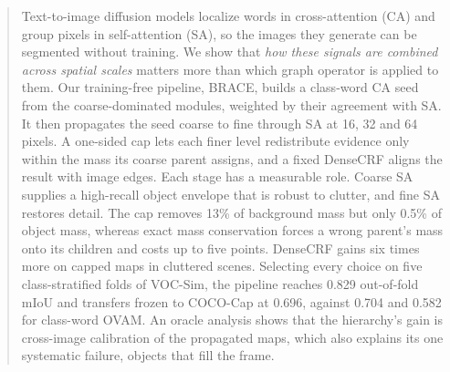 \begin{abstract}
Text-to-image diffusion models localize words in cross-attention (CA) and group pixels in self-attention (SA), so the images they generate can be segmented without training. We show that \emph{how these signals are combined across spatial scales} matters more than which graph operator is applied to them. Our training-free pipeline, BRACE, builds a class-word CA seed from the coarse-dominated modules, weighted by their agreement with SA. It then propagates the seed coarse to fine through SA at 16, 32 and 64 pixels. A one-sided cap lets each finer level redistribute evidence only within the mass its coarse parent assigns, and a fixed DenseCRF aligns the result with image edges. Each stage has a measurable role. Coarse SA supplies a high-recall object envelope that is robust to clutter, and fine SA restores detail. The cap removes 13\% of background mass but only 0.5\% of object mass, whereas exact mass conservation forces a wrong parent's mass onto its children and costs up to five points. DenseCRF gains six times more on capped maps in cluttered scenes. Selecting every choice on five class-stratified folds of VOC-Sim, the pipeline reaches 0.829 out-of-fold mIoU and transfers frozen to COCO-Cap at 0.696, against 0.704 and 0.582 for class-word OVAM. An oracle analysis shows that the hierarchy's gain is cross-image calibration of the propagated maps, which also explains its one systematic failure, objects that fill the frame.
\end{abstract}
